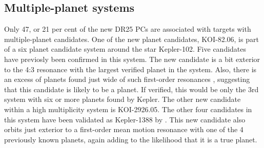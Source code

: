 \subsection{Multiple-planet systems}
Only 47, or 21 per cent of the new DR25 PCs are associated with targets with multiple-planet candidates. One of the new planet candidates, KOI-82.06, is part of a six planet candidate system around the star Kepler-102. Five candidates have previosly been confirmed \citep{Marcy2014,Rowe2014} in this system. The new candidate is a bit exterior to the 4:3 resonance with the largest verified planet in the system. Also, there is an excess of planets found just wide of such first-order resonances \citep{Lissauer2011}, suggesting that this candidate is likely to be a planet. If verified, this would be only the 3rd system with six or more planets found by Kepler. 
The other new candidate within a high multiplicity system is KOI-2926.05. The other four candidates in this system have been validated as Kepler-1388 by \citet{Morton2016}. This new candidate also orbits just exterior to a first-order mean motion resonance with one of the 4 previously known planets, again adding to the likelihood that it is a true planet.

